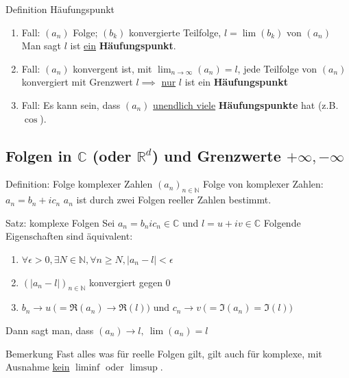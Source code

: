 \documentclass[a4paper,10pt]{article}
\begin{document}
\begin{defbox} {Definition Häufungspunkt}
    \begin{enumerate}
        \item Fall: $(a_n)$ Folge; $(b_k)$ konvergierte Teilfolge, $l=\lim(b_k)$ von $(a_n)$ Man sagt $l$ ist \underline{ein} \textbf{Häufungspunkt}.
        \item Fall: $(a_n)$ konvergent ist, mit $\lim_{n\to\infty}(a_n)=l$, jede Teilfolge von $(a_n)$ konvergiert mit Grenzwert $l \implies$ \underline{nur} $l$ ist ein \textbf{Häufungspunkt}
        \item Fall: Es kann sein, dass $(a_n)$ \underline{unendlich viele} \textbf{Häufungspunkte} hat (z.B. $\cos$).
    \end{enumerate}    
\end{defbox}

\subsection{Folgen in $\mathbb C$ (oder $\mathbb R^d$) und Grenzwerte $+\infty, -\infty$}
\begin{defbox}
    {Definition: Folge komplexer Zahlen}
    $(a_n)_{n\in\mathbb N}$ Folge von komplexer Zahlen: $a_n = b_n + ic_n$
    $a_n$ ist durch zwei Folgen reeller Zahlen bestimmt.
\end{defbox}
\begin{tbox}
    {Satz: komplexe Folgen}
    Sei $a_n=b_nic_n\in\mathbb C$ und $l=u+iv\in\mathbb C$
    Folgende Eigenschaften sind äquivalent:
    \begin{enumerate}
        \item $\forall \epsilon>0, \exists N\in\mathbb N, \forall n \ge N, |a_n-l|<\epsilon$
        \item $(|a_n-l|)_{n\in\mathbb N}$ konvergiert gegen $0$
        \item $b_n\longrightarrow u \ \big(=\Re(a_n)\longrightarrow\Re(l)\big)$ und $c_n\longrightarrow v \ \big(=\Im(a_n)=\Im(l)\big)$
    \end{enumerate}
         Dann sagt man, dass $(a_n)\longrightarrow l, \ \lim(a_n)=l$
\end{tbox}

\begin{bembox}
    {Bemerkung}
    Fast alles was für reelle Folgen gilt, gilt auch für komplexe, mit Ausnahme \underline{kein} $\liminf$ oder $\limsup$.
\end{bembox}
\end{document}
